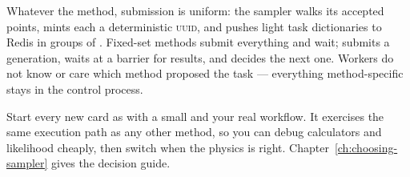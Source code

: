 Whatever the method, submission is uniform: the sampler walks its accepted points, mints
each a deterministic \textsc{uuid}, and pushes light task dictionaries to Redis in groups
of . Fixed-set methods submit everything and wait;
 submits a generation, waits at a barrier for results, and
decides the next one. Workers do not know or care which method proposed the task ---
everything method-specific stays in the control process.

\begin{jtip}
Start every new card as  with a small  and
your real workflow. It exercises the same execution path as any other method, so you can debug
calculators and likelihood cheaply, then switch  when the physics is
right. Chapter~\ref{ch:choosing-sampler} gives the decision guide.
\end{jtip}
